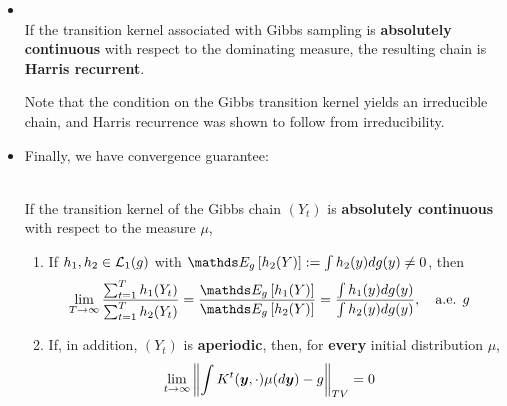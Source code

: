 \documentclass[11pt]{article}
\begin{document}
\begin{itemize}
\item \begin{lemma}\citep{robert1999monte}\\
If the transition kernel associated with Gibbs sampling is \textbf{absolutely continuous} with respect to the dominating measure, the resulting chain is \textbf{Harris recurrent}.
\end{lemma} Note that the condition on the Gibbs transition kernel yields an irreducible chain, and Harris recurrence was shown to follow from irreducibility.

\item Finally, we have convergence guarantee:
\begin{theorem}\citep{robert1999monte}\\
If the transition kernel of the Gibbs chain $(Y_t)$ is \textbf{absolutely continuous} with respect to the measure $\mu$,
\begin{enumerate}
\item If $h_1, h_2 \in {\mathcal L}_{1}(g)$ with $\E{g}{h_2(Y)} := \int h_2(y)dg(y) \neq 0$, then
\begin{align}
\lim_{T\rightarrow \infty}\frac{\sum_{t=1}^{T}h_1(Y_t) }{\sum_{t=1}^{T}h_2(Y_t) } &= \frac{\E{g}{h_1(Y)}}{\E{g}{h_2(Y)}}
= \frac{\int h_1(y)dg(y)}{\int h_2(y)dg(y)}, \quad \text{a.e. }g \label{eqn: gibbs_ergodic_exp_convergence}
\end{align}
\item If, in addition, $(Y_t)$ is \textbf{aperiodic}, then, for \textbf{every} initial distribution $\mu$,
\begin{align}
\lim_{t\rightarrow \infty}\left\|\int K^{t}(\boldsymbol{y}, \cdot)\mu(d\boldsymbol{y}) -  g\right\|_{TV} &= 0 \label{eqn: gibbs_ergodic_convergence}
\end{align}
\end{enumerate}
\end{theorem}
\end{itemize}
\end{document}
